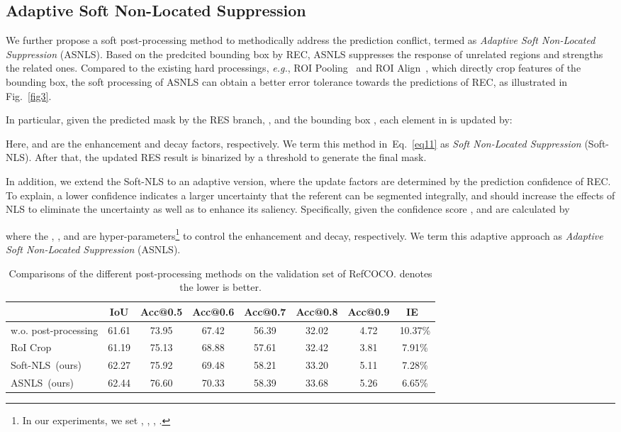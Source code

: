 \documentclass[10pt,twocolumn,letterpaper]{article}
\begin{document}
\subsection{Adaptive Soft Non-Located Suppression}
We further  propose a soft post-processing method to methodically  address the prediction conflict, termed as \emph{Adaptive Soft Non-Located Suppression} (ASNLS).
Based on the predcited bounding box by REC, ASNLS suppresses the response of unrelated regions and strengths the related ones. 
Compared to the existing hard processings, \emph{e.g.}, ROI Pooling~\cite{ren2017faster} and ROI Align~\cite{he2017mask}, which directly crop features of the  bounding box, the soft processing of ASNLS can obtain a better error tolerance towards the predictions of REC, as illustrated in Fig.~\ref{fig3}. 

In particular,  given the predicted mask by the RES branch, , and the bounding box , each element  in  is updated by:

Here,  and  are the enhancement and  decay factors, respectively. We term this method  in~Eq.~\ref{eq11} as \emph{Soft Non-Located Suppression} (Soft-NLS).   After that, the updated RES result   is binarized by  a threshold to generate the final mask.

In addition, we extend the Soft-NLS to an adaptive version, where the update factors are determined by the prediction confidence of REC. To explain, a lower confidence   indicates  a larger uncertainty that  the referent can be segmented integrally, and should increase the effects of NLS to eliminate the uncertainty as well as to enhance its saliency.  Specifically, given the confidence score ,  and  are calculated by

where  the ,   ,   and   are hyper-parameters\footnote{In our experiments, we set ,  ,  ,  .} to control  the  enhancement and decay, respectively. We term this adaptive approach as \emph{Adaptive Soft Non-Located Suppression} (ASNLS).   

\begin{table*}[t]
	\centering
	\caption{Comparisons of the different post-processing methods  on the validation set of RefCOCO.  denotes the lower is better. }
	\begin{tabular}{|l|c|c|c|c|c|c|c|}
		\hline
		\multicolumn{1}{|c|}{} & IoU & Acc@0.5 & Acc@0.6 & Acc@0.7 & Acc@0.8 & Acc@0.9 & IE~ \\ \hline
		w.o. post-processing & 61.61 & 73.95 & 67.42 & 56.39 & 32.02 & 4.72 & 10.37\% \\
		RoI Crop~\cite{he2017mask,ren2017faster} & 61.19 & 75.13 & 68.88 & 57.61 & 32.42 & 3.81 & 7.91\% \\
		Soft-NLS~(ours) & 62.27 & 75.92 & 69.48 & 58.21 & 33.20 & 5.11 & 7.28\% \\
		ASNLS~(ours) & 62.44 & 76.60 & 70.33 & 58.39 & 33.68 & 5.26 & 6.65\% \\ \hline
	\end{tabular}
	
	\label{tab2}
	\vspace{-0.5em}
\end{table*}
\end{document}
